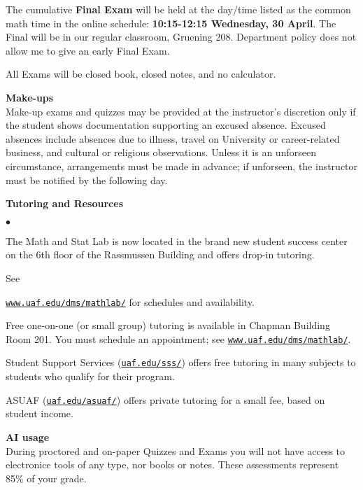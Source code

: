 \documentclass[12pt]{article}
\renewcommand{\emph}[1]{\textsf{\textbf{#1}}}
\newcommand{\localhead}[1]{\par\smallskip\textbf{#1} \smallskip\nobreak\\}%
\def\heading#1{\localhead{\large\emph{#1}}}
\newenvironment{clist}%
{\bgroup\parskip 0pt\begin{list}{$\bullet$}{\partopsep 4pt\topsep 0pt\itemsep -2pt}}%
{\end{list}\egroup}%
\begin{document}
The cumulative \emph{Final Exam} will be held at the day/time listed
as the common math time in the online schedule: \emph{10:15-12:15
Wednesday, 30 April}.  The Final will be in our regular classroom,
Gruening 208.  Department policy does not allow me to give an early
Final Exam.

All Exams will be closed book, closed notes, and no calculator.

\heading{Make-ups}
Make-up exams and quizzes may be provided at the instructor's
discretion only if
the student shows documentation supporting an excused absence. Excused
absences include absences due to illness, travel on University or
career-related business, and cultural or religious
observations. Unless it is an unforseen circumstance, arrangements
must be made in advance; if unforseen, the instructor must be notified
by the following day.


\newpage

\heading{Tutoring and Resources}
\vskip -30pt\strut
\begin{clist}
    \item The Math and Stat Lab is now located in the brand new
      student success center on the 6th floor of the Rassmussen Building and
      offers drop-in tutoring.

	See 

	\href{http://www.uaf.edu/dms/mathlab/}{\texttt{www.uaf.edu/dms/mathlab/}} for schedules and availability.
	\item Free
one-on-one (or small group) tutoring is available in 
Chapman Building Room 201. You must schedule an
appointment; see \href{http://www.uaf.edu/dms/mathlab/}{\texttt{www.uaf.edu/dms/mathlab/}}.
	\item Student Support Services (\href{https://uaf.edu/sss/}{\texttt{uaf.edu/sss/}}) offers free tutoring in many subjects to students who qualify for their program.
	\item ASUAF (\href{https://uaf.edu/asuaf/}{\texttt{uaf.edu/asuaf/}}) offers private tutoring for a small fee, based on student income.
\end{clist}


\clearpage\newpage

\strut

\vspace{-12pt}

\heading{AI usage}
During proctored and on-paper Quizzes and Exams you will not have access to electronice tools of any type, nor books or notes.  These assessments represent 85\% of your grade.
\end{document}
